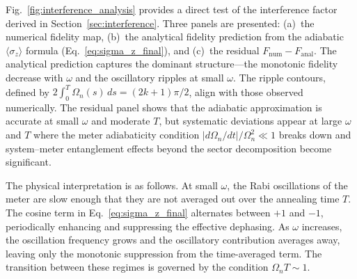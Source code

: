 \qquad Fig.~\ref{fig:interference_analysis} provides a direct test of the interference factor derived in Section~\ref{sec:interference}. Three panels are presented: (a)~the numerical fidelity map, (b)~the analytical fidelity prediction from the adiabatic $\langle\sigma_z\rangle$ formula (Eq.~\eqref{eq:sigma_z_final}), and (c)~the residual $F_{\mathrm{num}} - F_{\mathrm{anal}}$. The analytical prediction captures the dominant structure---the monotonic fidelity decrease with $\omega$ and the oscillatory ripples at small $\omega$. The ripple contours, defined by $2\int_0^T \Omega_n(s)\,ds = (2k+1)\pi/2$, align with those observed numerically. The residual panel shows that the adiabatic approximation is accurate at small $\omega$ and moderate $T$, but systematic deviations appear at large $\omega$ and $T$ where the meter adiabaticity condition $|d\Omega_n/dt|/\Omega_n^2 \ll 1$ breaks down and system--meter entanglement effects beyond the sector decomposition become significant.

\qquad The physical interpretation is as follows. At small $\omega$, the Rabi oscillations of the meter are slow enough that they are not averaged out over the annealing time $T$. The cosine term in Eq.~\eqref{eq:sigma_z_final} alternates between $+1$ and $-1$, periodically enhancing and suppressing the effective dephasing. As $\omega$ increases, the oscillation frequency grows and the oscillatory contribution averages away, leaving only the monotonic suppression from the time-averaged term. The transition between these regimes is governed by the condition $\Omega_n T \sim 1$.